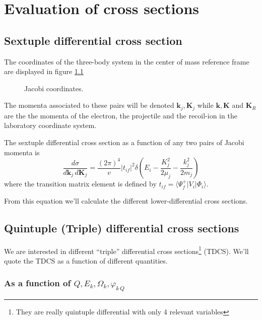\chapter{Evaluation of cross sections}
\label{C:txs}

\section{Sextuple differential cross section}
The coordinates of the three-body system in the center of mass
reference frame are displayed in figure \ref{f:jacobi}
%
\begin{figure}[!htb]
    \centering
\vspace{.5cm}
\caption{Jacobi coordinates. \label{f:jacobi}}
\end{figure}

The momenta associated to these pairs will be denoted
$\bm{k}_{j},\bm{K}_{j}$ while $\bm{k}, \bm{K}$ and $\bm{K}_{R}$ are the
the momenta of the electron, the projectile and the recoil-ion in the
laboratory coordinate system.

The sextuple differential cross section as a function of any two pairs
of Jacobi momenta is
%
\begin{equation}\label{Q:TDCS}
\frac{d \sigma}{d \bm{k}_{j} \, d \bm{K}_{j}} = \frac{(2
\pi)^{4}}{v} | t_{if}| ^{2} \delta \left( E_{i} -
\frac{K_{j}^{2}} {2 \mu_{j}} - \frac{k_{j}^{2}}{2 m_{j}}\right)
\end{equation}
%
where the transition matrix element is defined by $t_{if} = \langle
\Psi^{+}_{f} | V_{i} |  \Phi_{i} \rangle$.

From this equation we'll calculate the different lower-differential
cross sections.

\section{Quintuple (Triple) differential cross sections}

We are interested in different ``triple'' differential cross
sections\footnote{They are really quintuple differential with only 4
relevant variables} (TDCS). We'll quote the TDCS as a function of
different quantities.

\subsection{As a function of $Q,E_{k},\Omega_{k},
\varphi_{k\,Q}$}

